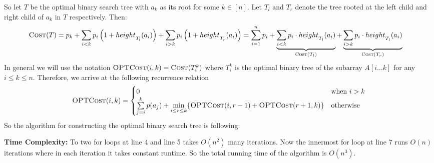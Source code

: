 So let $T$ be the optimal binary search tree with $a_k$ as its root for some $k\in[n]$. Let $T_l$ and $T_r$ denote the tree rooted at the left child and right child of $a_k$ in $T$ respectively. Then: \begin{align*}
	\textsc{Cost}(T) & = p_k+ {\sum_{i<k}p_i\left(1+height\strut_{T_l}(a_i)\right)}+{\sum_{i>k}p_i\left(1+height\strut_{T_r}(a_i)\right)} = \sum_{i=1}^n p_i+\underbrace{\sum_{i<k}p_i \cdot height\strut_{T_l}(a_i)}_{\textsc{Cost}(T_l)}+\underbrace{\sum_{i>k}p_i \cdot height\strut_{T_l}(a_i)}_{\textsc{Cost}(T_r)}
\end{align*}
In general we will use the notation $\textsc{OPTCost}(i,k)=\textsc{Cost}(T_i^k)$ where $T_i^k$ is the optimal binary tree of the subarray $A[i\dots k]$ for any $i\leq k\leq n$.  Therefore, we arrive at the following recurrence relation $$\textsc{OPTCost}(i,k)=\begin{cases}
	0&\text{when $i>k$}\\
	\sum\limits_{j=i}^k p(a_j)+\min\limits_{i\leq r\leq k}\{\textsc{OPTCost}(i,r-1)+\textsc{OPTCost}(r+1,k)\} & \text{otherwise}
\end{cases}$$
So the algorithm for constructing the optimal binary search tree is following:
\begin{algorithm}
\DontPrintSemicolon
\caption{$(A,P)$}
\end{algorithm}\parinf

\textbf{Time Complexity:} To two for loops at line 4 and line 5 takes $O(n^2)$ many iterations. Now the innermost for loop at line 7 runs $O(n)$ iterations where in each iteration it takes constant runtime. So the total running time of the algorithm is $O(n^3)$.